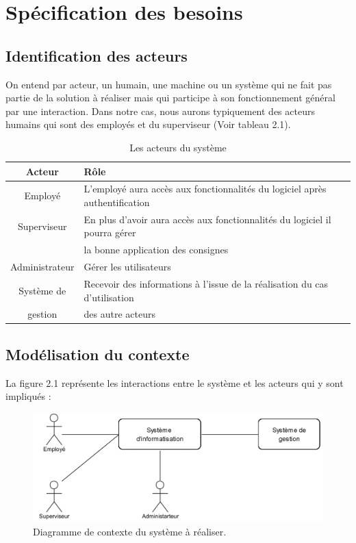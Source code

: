 \pagestyle{fancy}
\chead{}
\rhead{}
\lfoot{}
\cfoot{\thepage}
\rfoot{}

\section{Spécification des besoins}
	\subsection{Identification des acteurs}
	On entend par acteur, un humain, une machine ou un système qui ne fait pas partie de la solution à réaliser mais qui participe à son fonctionnement général par une interaction. Dans notre cas, nous aurons typiquement des acteurs humains qui sont des employés et du superviseur (Voir tableau 2.1).
	
\begin{table}[!ht]

		\begin{tabular}{|c|l|}
		\hline
		\textbf{Acteur} & \textbf{Rôle} \\
		\hline
		Employé & L'employé aura accès aux fonctionnalités du logiciel après authentification\\
		\hline
		Superviseur & En plus d'avoir aura accès aux fonctionnalités du logiciel il pourra gérer\\
		& la bonne application des consignes\\
		\hline
		Administrateur & Gérer les utilisateurs\\
		\hline
		Système de &  Recevoir des informations à l'issue de la réalisation du cas d'utilisation\\gestion &des autre acteurs\\
		\hline
		\end{tabular}
		\caption{Les acteurs du système}
	\end{table}
	
	\subsection{Modélisation du contexte}
	La figure 2.1 représente les interactions entre le système et les acteurs qui y sont impliqués :
	
	\begin{figure}[!h]
		\center
			\includegraphics[scale=1.2]{images/DC}
			\caption{Diagramme de contexte du système à réaliser.}
	\end{figure}
	
